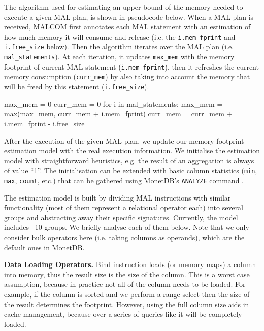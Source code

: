 \documentclass[conference]{IEEEtran}
\def\Skip{\par\medskip\nobreak\noindent}
\begin{document}
The algorithm used for estimating an upper bound of the memory needed to execute a given MAL plan, is shown in pseudocode below.
When a MAL plan is received, MALCOM first annotates each MAL statement with an estimation of how much memory it will consume and release (i.e. the \texttt{\small i.mem\_fprint} and \texttt{\small i.free\_size} below).
Then the algorithm iterates over the MAL plan (i.e. \texttt{\small mal\_statements}).
At each iteration, it updates \texttt{\small max\_mem} with the memory footprint of current MAL statement (\texttt{\small i.mem\_fprint}), then it refreshes the current memory consumption (\texttt{\small curr\_mem}) by also taking into account the memory that will be freed by this statement (\texttt{\small i.free\_size}). 
\begin{verb}
max_mem  = 0
curr_mem = 0 
for i in mal_statements:
  max_mem = max(max_mem, curr_mem + i.mem_fprint)
  curr_mem = curr_mem + i.mem_fprint - i.free_size
\end{verb}

After the execution of the given MAL plan, we update our memory footprint estimation model with the real execution information.
We initialise the estimation model with straightforward heuristics, e.g. the result of an aggregation is always of value ``1''.
The initialisation can be extended with basic column statistics (\texttt{\small min}, \texttt{\small max}, \texttt{\small count}, etc.) that can be gathered using MonetDB’s \texttt{\small ANALYZE} command .

The estimation model is built by dividing MAL instructions with similar functionality (most of them represent a relational operator each) into several groups and abstracting away their specific signatures.
Currently, the model includes ~10 groups.
We briefly analyse each of them below.
Note that we only consider bulk operators here (i.e. taking columns as operands), which are the default ones in MonetDB.

\Skip\textbf{Data Loading Operators.}
Bind instruction loads (or memory maps) a column into memory, thus the result size is the size of the column.
This is a worst case assumption, because in practice not all of the column needs to be loaded.
For example, if the column is sorted and we perform a range select then the size of the result determines the footprint.
However, using the full column size aids in cache management, because over a series of queries like it will be completely loaded.
\end{document}
